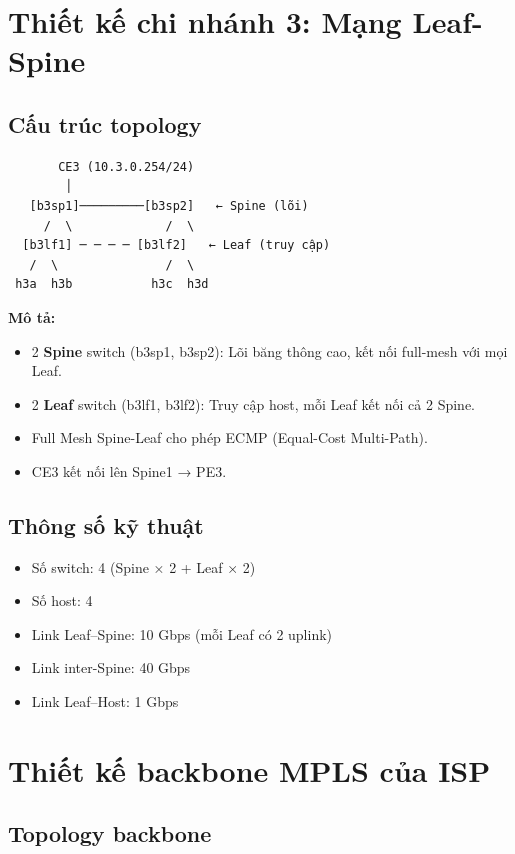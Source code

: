 \section{Thiết kế chi nhánh 3: Mạng Leaf-Spine}

\subsection{Cấu trúc topology}

\begin{verbatim}
       CE3 (10.3.0.254/24)
        │
   [b3sp1]─────────[b3sp2]   ← Spine (lõi)
     /  \             /  \
  [b3lf1] ─ ─ ─ ─ [b3lf2]   ← Leaf (truy cập)
   /  \               /  \
 h3a  h3b           h3c  h3d
\end{verbatim}

\textbf{Mô tả:}
\begin{itemize}
    \item 2 \textbf{Spine} switch (b3sp1, b3sp2): Lõi băng thông cao, kết nối full-mesh với mọi Leaf.
    \item 2 \textbf{Leaf} switch (b3lf1, b3lf2): Truy cập host, mỗi Leaf kết nối cả 2 Spine.
    \item Full Mesh Spine-Leaf cho phép ECMP (Equal-Cost Multi-Path).
    \item CE3 kết nối lên Spine1 → PE3.
\end{itemize}

\subsection{Thông số kỹ thuật}
\begin{itemize}
    \item Số switch: 4 (Spine × 2 + Leaf × 2)
    \item Số host: 4
    \item Link Leaf–Spine: 10 Gbps (mỗi Leaf có 2 uplink)
    \item Link inter-Spine: 40 Gbps
    \item Link Leaf–Host: 1 Gbps
\end{itemize}

\section{Thiết kế backbone MPLS của ISP}

\subsection{Topology backbone}

